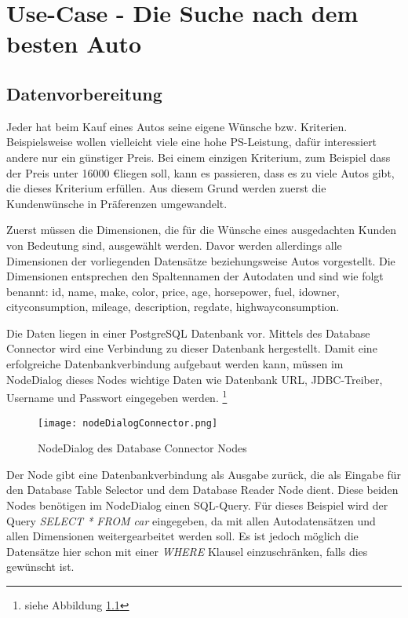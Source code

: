 \chapter{Use-Case - Die Suche nach dem besten Auto}
\label{ch:useCase}
\section{Datenvorbereitung}
\label{ch:Evaluierung:sec:vorbereitung}
Jeder hat beim Kauf eines Autos seine eigene Wünsche bzw. Kriterien. Beispielsweise wollen vielleicht viele eine hohe PS-Leistung, dafür interessiert andere nur ein günstiger Preis. Bei einem einzigen Kriterium, zum Beispiel dass der Preis unter 16000 \euro liegen soll, kann es passieren, dass es zu viele Autos gibt, die dieses Kriterium erfüllen. Aus diesem Grund werden zuerst die Kundenwünsche in Präferenzen umgewandelt.

Zuerst müssen die Dimensionen, die für die Wünsche eines ausgedachten Kunden von Bedeutung sind, ausgewählt werden. Davor werden allerdings alle Dimensionen der vorliegenden Datensätze beziehungsweise Autos vorgestellt. Die Dimensionen entsprechen den Spaltennamen der Autodaten und sind wie folgt benannt: id, name, make, color, price, age, horsepower, fuel, idowner, city\textunderscore consumption, mileage, description, reg\textunderscore date, highway\textunderscore consumption.

Die Daten liegen in einer PostgreSQL Datenbank vor. Mittels des Database Connector wird eine Verbindung zu dieser Datenbank hergestellt. Damit eine erfolgreiche Datenbankverbindung aufgebaut werden kann, müssen im NodeDialog dieses Nodes wichtige Daten wie Datenbank URL, JDBC-Treiber, Username und Passwort eingegeben werden. \footnote{siehe Abbildung \ref{img:nodeDialogConnector}} 

\begin{figure}[H]
	\centering
	\texttt{[image: nodeDialogConnector.png]}
	\caption{NodeDialog des Database Connector Nodes}
	\label{img:nodeDialogConnector}
\end{figure} 

Der Node gibt eine Datenbankverbindung als Ausgabe zurück, die als Eingabe für den Database Table Selector und dem Database Reader Node dient. Diese beiden Nodes benötigen im NodeDialog einen SQL-Query. Für dieses Beispiel wird der Query \textit{SELECT * FROM car} eingegeben, da mit allen Autodatensätzen und allen Dimensionen weitergearbeitet werden soll. Es ist jedoch möglich die Datensätze hier schon mit einer \textit{WHERE} Klausel einzuschränken, falls dies gewünscht ist.

